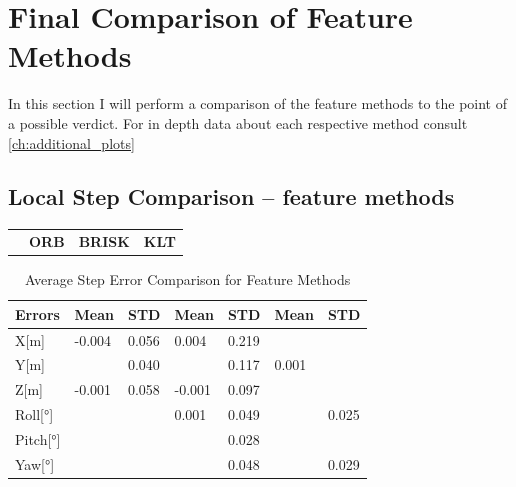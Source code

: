 {    
\section{Final Comparison of Feature Methods}{
        In this section I will perform a comparison of the feature methods to the point of a possible verdict. For in depth data about each respective method consult \cref{ch:additional_plots}

        \subsection{Local Step Comparison – feature methods}{

        \begin{tabular}{p{2cm} p{3.5cm} p{3.7cm} p{2cm}}
            & \textbf{ORB} & \textbf{BRISK} & \textbf{KLT}
        \end{tabular}

        \begin{table}[!ht]
            \setlength{\extrarowheight}{5pt}
            \centering
            \large
            \begin{tabular}{p{1.3cm}| p{1.5cm} p{1.5cm}| p{1.5cm} p{1.5cm}| p{1.5cm} p{1.5cm}}
                \hline
                \textbf{Errors} & Mean & STD & Mean & STD & Mean & STD\\[12pt]
                \hline
                X[m] & -0.004 & 0.056 & 0.004 & 0.219 & \text{\color{Green}{-0.003}} & \text{\color{Cyan}{0.048}}\\[3pt]
                \hline
                Y[m] & \text{\color{Green}{0}} & 0.040 & \text{\color{Green}{0}} & 0.117 & 0.001 & \text{\color{Cyan}{0.035}}\\[3pt]
                \hline
                Z[m] & -0.001 & 0.058 & -0.001 & 0.097 & \text{\color{Green}{0}} & \text{\color{Cyan}{0.046}}\\[3pt]
                \hline
                Roll[°] & \text{\color{Green}{0}} & \text{\color{Cyan}{0.024}} & 0.001 & 0.049 & \text{\color{Green}{0}} & 0.025\\[3pt]
                \hline
                Pitch[°] & \text{\color{Green}{0}} & \text{\color{Cyan}{0.024}} & \text{\color{Green}{0}} & 0.028 & \text{\color{Green}{0}} & \text{\color{Cyan}{0.024}}\\[3pt]
                \hline
                Yaw[°] & \text{\color{Green}{0}} & \text{\color{Cyan}{0.024}} & \text{\color{Green}{0}} & 0.048 & \text{\color{Green}{0}} & 0.029\\[3pt]
            \end{tabular}
            \caption{Average Step Error Comparison for Feature Methods}
            \label{tab:step_errors_methods}
        \end{table}

}}}
